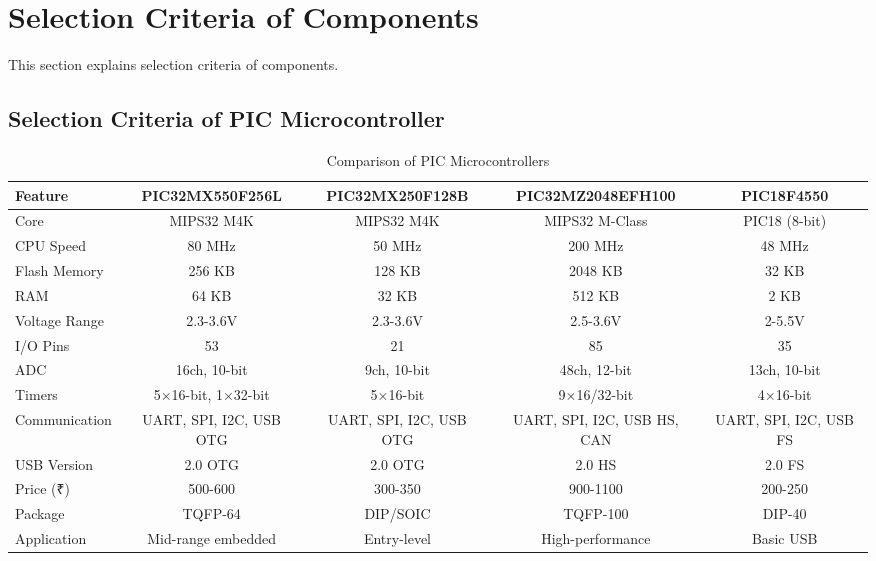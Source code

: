 \documentclass[12pt]{report}
\begin{document}
\section{Selection Criteria of Components}
\begin{flushleft}
This section explains selection criteria of components.
\end{flushleft}

\subsection{Selection Criteria of PIC Microcontroller}
\begin{table}[ht]
    \centering
    \caption{Comparison of PIC Microcontrollers}
    \label{tab:pic_comparison}
    \small %
    \begin{adjustbox}{width=\textwidth}
    \begin{tabular}{@{}>{\raggedright}p{3.2cm}cccc@{}}
        \toprule
        \textbf{Feature} & \textbf{PIC32MX550F256L} & \textbf{PIC32MX250F128B} & \textbf{PIC32MZ2048EFH100} & \textbf{PIC18F4550} \\
        \midrule
        Core & MIPS32 M4K & MIPS32 M4K & MIPS32 M-Class & PIC18 (8-bit) \\
        CPU Speed & 80 MHz & 50 MHz & 200 MHz & 48 MHz \\
        Flash Memory & 256 KB & 128 KB & 2048 KB & 32 KB \\
        RAM & 64 KB & 32 KB & 512 KB & 2 KB \\
        Voltage Range & 2.3-3.6V & 2.3-3.6V & 2.5-3.6V & 2-5.5V \\
        I/O Pins & 53 & 21 & 85 & 35 \\
        ADC & 16ch, 10-bit & 9ch, 10-bit & 48ch, 12-bit & 13ch, 10-bit \\
        Timers & 5×16-bit, 1×32-bit & 5×16-bit & 9×16/32-bit & 4×16-bit \\
        Communication & UART, SPI, I2C, USB OTG & UART, SPI, I2C, USB OTG & UART, SPI, I2C, USB HS, CAN & UART, SPI, I2C, USB FS \\
        USB Version & 2.0 OTG & 2.0 OTG & 2.0 HS & 2.0 FS \\
        Price (₹) & 500-600 & 300-350 & 900-1100 & 200-250 \\
        Package & TQFP-64 & DIP/SOIC & TQFP-100 & DIP-40 \\
        Application & Mid-range embedded & Entry-level & High-performance & Basic USB \\
        \bottomrule
    \end{tabular}
    \end{adjustbox}
\end{table}
\end{document}
